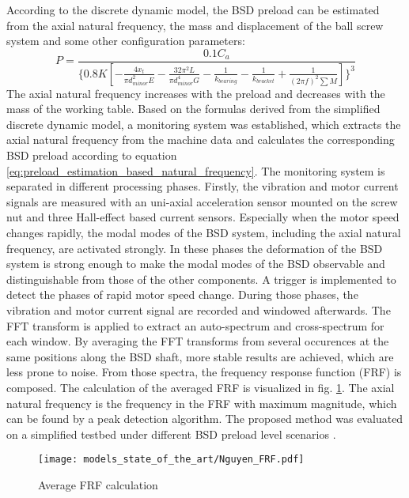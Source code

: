 According to the discrete dynamic model, the BSD preload can be estimated from the axial natural frequency, the mass and displacement of the ball screw system and some other configuration parameters:
\begin{equation}
    P=\frac{0.1C_{a}}{\{0.8K[ -\frac{4x_{t}}{\pi d_{minor}^{2}E} -\frac{32\pi^{2}L}{\pi d_{minor}^{4}G}-\frac{1}{k_{bearing}}-\frac{1}{k_{bracket}}+\frac{1}{(2\pi f)^{2}\sum M} ]\}^{3}}
\label{eq:preload_estimation_based_natural_frequency}
\end{equation}
The axial natural frequency increases with the preload and decreases with the mass of the working table. Based on the formulas derived from the simplified discrete dynamic model, a monitoring system was established, which extracts the axial natural frequency from the machine data and calculates the corresponding BSD preload according to equation \ref{eq:preload_estimation_based_natural_frequency}. The monitoring system is separated in different processing phases. Firstly, the vibration and motor current signals are measured with an uni-axial acceleration sensor mounted on the screw nut and three Hall-effect based current sensors. Especially when the motor speed changes rapidly, the modal modes of the BSD system, including the axial natural frequency, are activated strongly. In these phases the deformation of the BSD system is strong enough to make the modal modes of the BSD observable and distinguishable from those of the other components. A trigger is implemented to detect the phases of rapid motor speed change. During those phases, the vibration and motor current signal are recorded and windowed afterwards. The FFT transform is applied to extract an auto-spectrum and cross-spectrum for each window. By averaging the FFT transforms from several occurences at the same positions along the BSD shaft, more stable results are achieved, which are less prone to noise. From those spectra, the frequency response function (FRF) is composed. The calculation of the averaged FRF is visualized in fig. \ref{fig:Nguyen_frf}. The axial natural frequency is the frequency in the FRF with maximum magnitude, which can be found by a peak detection algorithm. The proposed method was evaluated on a simplified testbed under different BSD preload level scenarios \cite{NGUYEN2019}.

\begin{figure}[H]
  \centering
  \texttt{[image: models\_state\_of\_the\_art/Nguyen\_FRF.pdf]}
  \caption{Average FRF calculation \cite{NGUYEN2019}}
  \label{fig:Nguyen_frf}
\end{figure}

